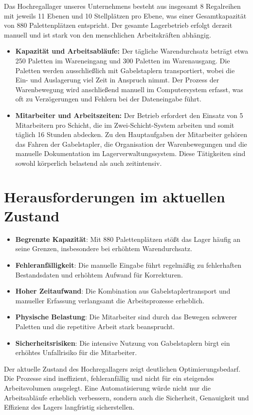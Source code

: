 Das Hochregallager unseres Unternehmens besteht aus insgesamt 8 Regalreihen mit jeweils 11 Ebenen und 10 Stellplätzen pro Ebene, was einer Gesamtkapazität von 880 Palettenplätzen entspricht. Der gesamte Lagerbetrieb erfolgt derzeit manuell und ist stark von den menschlichen Arbeitskräften abhängig.
\begin{itemize}
	\item \textbf{Kapazität und Arbeitsabläufe:} 
	Der tägliche Warendurchsatz beträgt etwa 250 Paletten im Wareneingang und 300 Paletten im Warenausgang. Die Paletten werden ausschließlich mit Gabelstaplern transportiert, wobei die Ein- und Auslagerung viel Zeit in Anspruch nimmt. Der Prozess der Warenbewegung wird anschließend manuell im Computersystem erfasst, was oft zu Verzögerungen und Fehlern bei der Dateneingabe führt.
	
	\item \textbf{Mitarbeiter und Arbeitszeiten:}
	Der Betrieb erfordert den Einsatz von 5 Mitarbeitern pro Schicht, die im Zwei-Schicht-System arbeiten und somit täglich 16 Stunden abdecken. Zu den Hauptaufgaben der Mitarbeiter gehören das Fahren der Gabelstapler, die Organisation der Warenbewegungen und die manuelle Dokumentation im Lagerverwaltungssystem. Diese Tätigkeiten sind sowohl körperlich belastend als auch zeitintensiv.
\end{itemize}


\section{Herausforderungen im aktuellen Zustand}

\begin{itemize}
	\item \textbf{Begrenzte Kapazität}: Mit 880 Palettenplätzen stößt das Lager häufig an seine Grenzen, insbesondere bei erhöhtem Warendurchsatz.
	\item \textbf{Fehleranfälligkeit}: Die manuelle Eingabe führt regelmäßig zu fehlerhaften Bestandsdaten und erhöhtem Aufwand für Korrekturen.
	\item \textbf{Hoher Zeitaufwand}: Die Kombination aus Gabelstaplertransport und manueller Erfassung verlangsamt die Arbeitsprozesse erheblich.
	\item \textbf{Physische Belastung}: Die Mitarbeiter sind durch das Bewegen schwerer Paletten und die repetitive Arbeit stark beansprucht.
	\item \textbf{Sicherheitsrisiken}: Die intensive Nutzung von Gabelstaplern birgt ein erhöhtes Unfallrisiko für die Mitarbeiter.
\end{itemize}


Der aktuelle Zustand des Hochregallagers zeigt deutlichen Optimierungsbedarf. Die Prozesse sind ineffizient, fehleranfällig und nicht für ein steigendes Arbeitsvolumen ausgelegt. Eine Automatisierung würde nicht nur die Arbeitsabläufe erheblich verbessern, sondern auch die Sicherheit, Genauigkeit und Effizienz des Lagers langfristig sicherstellen.